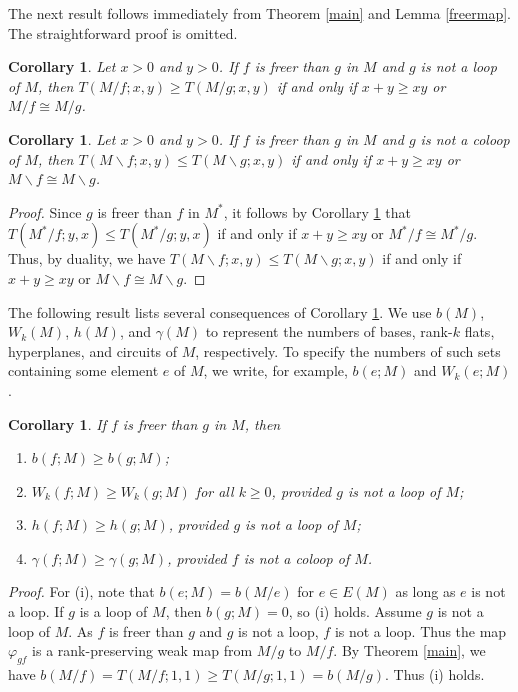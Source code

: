 \documentclass[12pt,reqno]{amsart}
\newtheorem{corollary}[theorem]{Corollary}
\theoremstyle{definition}
\theoremstyle{remark}
\numberwithin{equation}{section}
\newcommand{\del}{\backslash}
\begin{document}
The next result follows immediately from Theorem \ref{main} and Lemma \ref{freermap}. The straightforward proof is omitted. 

    \begin{corollary}\label{combos}
        Let $x>0$ and $y>0$. If $f$ is freer than $g$ in $M$ and $g$ is not a loop of $M$, then $T(M/f;x,y)\geq T(M/g;x,y)$ if and only if $x+y\geq xy$ or $M/f\cong M/g$. 
    \end{corollary}

    \begin{corollary}
        Let $x>0$ and $y>0$. If $f$ is freer than $g$ in $M$ and $g$ is not a coloop of $M$, then $T(M\del f;x,y)\leq T(M\del g;x,y)$ if and only if $x+y\geq xy$ or $M\del f\cong M\del g$. 
    \end{corollary}

    \begin{proof}
        Since $g$ is freer than $f$ in $M^*$, it follows by Corollary \ref{combos} that $T(M^*/f;y,x)\leq T(M^*/g;y,x)$ if and only if $x+y \geq xy$ or $M^*/f\cong M^*/g$. Thus, by duality, we have $T(M\del f;x,y)\leq T(M\del g;x,y)$ if and only if $x+y\geq xy$ or $M\del f\cong M\del g$. 
    \end{proof}

    The following result lists several consequences of Corollary \ref{combos}. We use $b(M)$, $W_k(M)$, $h(M)$, and $\gamma(M)$ to represent the numbers of bases, rank-$k$ flats, hyperplanes, and circuits of $M$, respectively. To specify the numbers of such sets containing some element $e$ of $M$, we write, for example, $b(e;M)$ and $W_k(e;M)$. 

    \begin{corollary}\label{cnt}
        If $f$ is freer than $g$ in $M$, then 
        \begin{enumerate}[label=(\roman*)]
            \item $b(f;M)\geq b(g;M)$; 
            \item $W_{k}(f;M)\geq W_{k}(g;M)$ for all $k\geq 0$, provided $g$ is not a loop of $M$; 
            \item $h(f;M)\geq h(g;M)$, provided $g$ is not a loop of $M$;
            \item $\gamma(f;M)\geq \gamma(g;M)$, provided $f$ is not a coloop of $M$.

        \end{enumerate}
    \end{corollary}
    \noindent \textit{Proof.}
    For (i), note that $b(e;M)=b(M/e)$ for $e\in E(M)$ as long as $e$ is not a loop. If $g$ is a loop of $M$, then $b(g;M)=0$, so (i) holds. Assume $g$ is not a loop of $M$. As $f$ is freer than $g$ and $g$ is not a loop, $f$ is not a loop. Thus the map $\varphi_{gf}$ is a rank-preserving weak map from $M/g$ to $M/f$. By Theorem \ref{main}, we have $b(M/f)=T(M/f;1,1)\geq T(M/g;1,1)=b(M/g)$. Thus (i) holds. 
        
\end{document}

